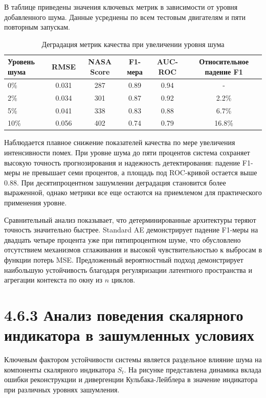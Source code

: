 \documentclass[14pt, a4paper, oneside]{extreport}
\begin{document}
В таблице приведены значения ключевых метрик в зависимости от уровня добавленного шума. Данные усреднены по всем тестовым двигателям и пяти повторным запускам.

\begin{table}[htbp]
\centering
\caption{Деградация метрик качества при увеличении уровня шума}
\label{tab:noise_robustness}
\begin{tabular}{lccccc}
\hline
Уровень шума & RMSE & NASA Score & F1-мера & AUC-ROC & Относительное падение F1 \\
\hline
0\% & 0.031 & 287 & 0.89 & 0.94 & - \\
2\% & 0.034 & 301 & 0.87 & 0.92 & 2.2\% \\
5\% & 0.041 & 338 & 0.83 & 0.88 & 6.7\% \\
10\% & 0.056 & 402 & 0.74 & 0.79 & 16.8\% \\
\hline
\end{tabular}
\end{table}

Наблюдается плавное снижение показателей качества по мере увеличения интенсивности помех. При уровне шума до пяти процентов система сохраняет высокую точность прогнозирования и надежность детектирования: падение F1-меры не превышает семи процентов, а площадь под ROC-кривой остается выше 0.88. При десятипроцентном зашумлении деградация становится более выраженной, однако метрики все еще остаются на приемлемом для практического применения уровне.

Сравнительный анализ показывает, что детерминированные архитектуры теряют точность значительно быстрее. Standard AE демонстрирует падение F1-меры на двадцать четыре процента уже при пятипроцентном шуме, что обусловлено отсутствием механизмов сглаживания и высокой чувствительностью к выбросам в функции потерь MSE. Предложенный вероятностный подход демонстрирует наибольшую устойчивость благодаря регуляризации латентного пространства и агрегации контекста по окну из $n$ циклов.

\vspace{1em}
\section{4.6.3 Анализ поведения скалярного индикатора в зашумленных условиях}
\vspace{1em}

Ключевым фактором устойчивости системы является раздельное влияние шума на компоненты скалярного индикатора $S_t$. На рисунке представлена динамика вклада ошибки реконструкции и дивергенции Кульбака-Лейблера в значение индикатора при различных уровнях зашумления.
\end{document}
